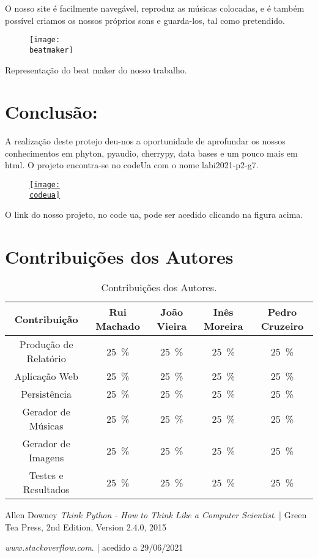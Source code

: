 O nosso site é facilmente navegável, reproduz as músicas colocadas, e é também possível criamos os nossos próprios sons e guarda-los, tal como pretendido. 

\begin{figure}[h]
\center
\texttt{[image: \\beatmaker]}
\label{Print do nosso beatmaker}
\end{figure}

\center Representação do beat maker do nosso trabalho. 
%
%
\chapter{Conclusão:}
\label{chap.conclusão}
A realização deste protejo deu-nos a oportunidade de aprofundar os nossos conhecimentos em phyton, pyaudio, cherrypy, data bases e um pouco mais em html. O projeto encontra-se no codeUa com o nome labi2021-p2-g7. 
\begin{figure}[h]
\center
\href{https://code.ua.pt//projects/labi2021-p2-g7}{\texttt{[image: \\codeua]}}
\end{figure}
\center O link do nosso projeto, no code ua, pode ser acedido clicando na figura acima. 
%
% 
\chapter*{Contribuições dos Autores}
\begin{table}[H]
    \centering
    \caption{Contribuições dos Autores.}
    \begin{tabular}{|c|c|c|c|c|}\hline
        Contribuição & Rui Machado & João Vieira & Inês Moreira & Pedro Cruzeiro  \\ 
        \hline
	    Produção de Relatório & 25~\% & 25~\% & 25~\% & 25~\%	\\
	    Aplicação Web & 25~\% & 25~\% & 25~\% & 25~\%	\\
	    Persistência & 25~\% & 25~\% & 25~\% & 25~\% \\
	    Gerador de Músicas & 25~\% & 25~\% & 25~\% & 25~\% \\
	    Gerador de Imagens & 25~\% & 25~\% & 25~\% & 25~\% \\ 
		Testes e Resultados & 25~\% & 25~\% & 25~\% & 25~\% \\
		   
    \hline
    \end{tabular}
    \label{tab.contribuições}
\end{table}	
%
%
\begin{thebibliography}{9}
Allen Downey
\textit{Think Python - How to Think Like a Computer Scientist}. |
Green Tea Press, 2nd Edition, Version 2.4.0, 2015

\textit{www.stackoverflow.com}. | acedido a 29/06/2021
\end{thebibliography}

